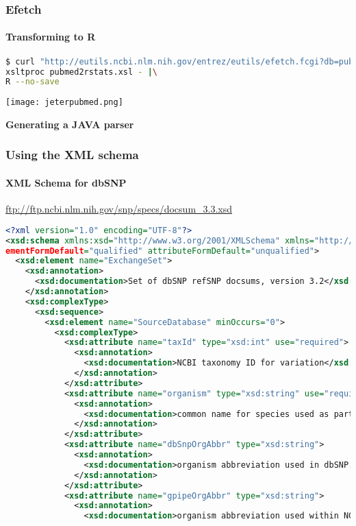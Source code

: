 \documentclass{beamer}
\newcommand{\centeredtitle}[1]{
\begin{center}
    \Huge{\bf{#1}}
\end{center}
}
\newcommand{\hugeslide}[1]{
\begin{frame}
\centeredtitle{#1}
\end{frame}
}
\begin{document}
\begin{frame}[fragile]
\frametitle{Efetch}
\framesubtitle{Transforming to R}

\begin{lstlisting}[language=bash,basicstyle=\tiny,breaklines=true,escapechar=\!]
$ curl "http://eutils.ncbi.nlm.nih.gov/entrez/eutils/efetch.fcgi?db=pubmed&usehistory=true&WebEnv=NCID_1_52434791_130.14.22.215_9001_1375957034_1619786167&query_key=1&retmode=xml" |\
xsltproc pubmed2rstats.xsl - |\
R --no-save
\end{lstlisting}

\begin{center}
\texttt{[image: jeterpubmed.png]}
\end{center}
\end{frame}

\hugeslide{Generating a JAVA parser}


\begin{frame}[fragile]
\frametitle{Using the XML schema}
\framesubtitle{XML Schema for dbSNP}
\url{ftp://ftp.ncbi.nlm.nih.gov/snp/specs/docsum_3.3.xsd}
\begin{lstlisting}[language=xml,basicstyle=\tiny,breaklines=false]
<?xml version="1.0" encoding="UTF-8"?>
<xsd:schema xmlns:xsd="http://www.w3.org/2001/XMLSchema" xmlns="http://www.ncbi.nlm.nih.gov/SNP/docsum" targetNamespace="http://www.ncbi.nlm.nih.gov/SNP/docsum" el
ementFormDefault="qualified" attributeFormDefault="unqualified">
  <xsd:element name="ExchangeSet">
    <xsd:annotation>
      <xsd:documentation>Set of dbSNP refSNP docsums, version 3.2</xsd:documentation>
    </xsd:annotation>
    <xsd:complexType>
      <xsd:sequence>
        <xsd:element name="SourceDatabase" minOccurs="0">
          <xsd:complexType>
            <xsd:attribute name="taxId" type="xsd:int" use="required">
              <xsd:annotation>
                <xsd:documentation>NCBI taxonomy ID for variation</xsd:documentation>
              </xsd:annotation>
            </xsd:attribute>
            <xsd:attribute name="organism" type="xsd:string" use="required">
              <xsd:annotation>
                <xsd:documentation>common name for species used as part of database name.</xsd:documentation>
              </xsd:annotation>
            </xsd:attribute>
            <xsd:attribute name="dbSnpOrgAbbr" type="xsd:string">
              <xsd:annotation>
                <xsd:documentation>organism abbreviation used in dbSNP. </xsd:documentation>
              </xsd:annotation>
            </xsd:attribute>
            <xsd:attribute name="gpipeOrgAbbr" type="xsd:string">
              <xsd:annotation>
                <xsd:documentation>organism abbreviation used within NCBI genome pipeline data dumps.</xsd:documentation>
\end{lstlisting}
\end{frame}
\end{document}

